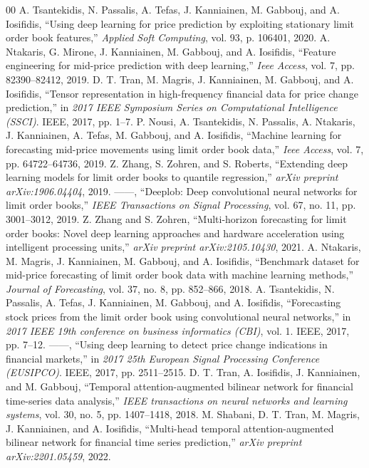 \documentclass[conference]{IEEEtran}
\begin{document}
\begin{thebibliography}{00}
 A. Tsantekidis, N. Passalis, A. Tefas, J. Kanniainen, M. Gabbouj, and A. Iosifidis, ``Using deep learning for price prediction by exploiting stationary limit order book features,'' \textit{Applied Soft Computing}, vol. 93, p. 106401, 2020.
 A. Ntakaris, G. Mirone, J. Kanniainen, M. Gabbouj, and A. Iosifidis, ``Feature engineering for mid-price prediction with deep learning,'' \textit{Ieee Access}, vol. 7, pp. 82390--82412, 2019.
 D. T. Tran, M. Magris, J. Kanniainen, M. Gabbouj, and A. Iosifidis, ``Tensor representation in high-frequency financial data for price change prediction,'' in \textit{2017 IEEE Symposium Series on Computational Intelligence (SSCI)}. IEEE, 2017, pp. 1--7.
 P. Nousi, A. Tsantekidis, N. Passalis, A. Ntakaris, J. Kanniainen, A. Tefas, M. Gabbouj, and A. Iosifidis, ``Machine learning for forecasting mid-price movements using limit order book data,'' \textit{Ieee Access}, vol. 7, pp. 64722--64736, 2019.
 Z. Zhang, S. Zohren, and S. Roberts, ``Extending deep learning models for limit order books to quantile regression,'' \textit{arXiv preprint arXiv:1906.04404}, 2019.
 ------, ``Deeplob: Deep convolutional neural networks for limit order books,'' \textit{IEEE Transactions on Signal Processing}, vol. 67, no. 11, pp. 3001--3012, 2019.
 Z. Zhang and S. Zohren, ``Multi-horizon forecasting for limit order books: Novel deep learning approaches and hardware acceleration using intelligent processing units,'' \textit{arXiv preprint arXiv:2105.10430}, 2021.
 A. Ntakaris, M. Magris, J. Kanniainen, M. Gabbouj, and A. Iosifidis, ``Benchmark dataset for mid-price forecasting of limit order book data with machine learning methods,'' \textit{Journal of Forecasting}, vol. 37, no. 8, pp. 852--866, 2018.
 A. Tsantekidis, N. Passalis, A. Tefas, J. Kanniainen, M. Gabbouj, and A. Iosifidis, ``Forecasting stock prices from the limit order book using convolutional neural networks,'' in \textit{2017 IEEE 19th conference on business informatics (CBI)}, vol. 1. IEEE, 2017, pp. 7--12.
 ------, ``Using deep learning to detect price change indications in financial markets,'' in \textit{2017 25th European Signal Processing Conference (EUSIPCO)}. IEEE, 2017, pp. 2511--2515.
 D. T. Tran, A. Iosifidis, J. Kanniainen, and M. Gabbouj, ``Temporal attention-augmented bilinear network for financial time-series data analysis,'' \textit{IEEE transactions on neural networks and learning systems}, vol. 30, no. 5, pp. 1407--1418, 2018.
 M. Shabani, D. T. Tran, M. Magris, J. Kanniainen, and A. Iosifidis, ``Multi-head temporal attention-augmented bilinear network for financial time series prediction,'' \textit{arXiv preprint arXiv:2201.05459}, 2022.

\end{thebibliography}
\end{document}
